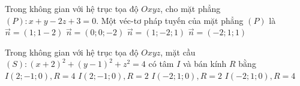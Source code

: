 \begin{ex}%
Trong không gian với hệ trục tọa độ $Oxyz$, cho mặt phẳng $(P)\colon x+y-2z+3=0$. Một véc-tơ pháp tuyến của mặt phẳng $(P)$ là
\choice 
{\True $\vec{n}=(1;1-2)$}
{$\vec{n}=(0;0;-2)$}
{$\vec{n}=(1;-2;1)$}
{$\vec{n}=(-2;1;1)$}
\end{ex}

\begin{ex}%
Trong không gian với hệ trục tọa độ $Oxyz$, mặt cầu $(S): (x+2)^2+(y-1)^2+z^2=4$ có tâm $I$ và bán kính $R$ bằng
\choice 
{$I(2;-1;0), R=4$}
{$I(2;-1;0), R=2$}
{\True $I(-2;1;0), R=2$}
{$I(-2;1;0), R=4$}
\end{ex}

